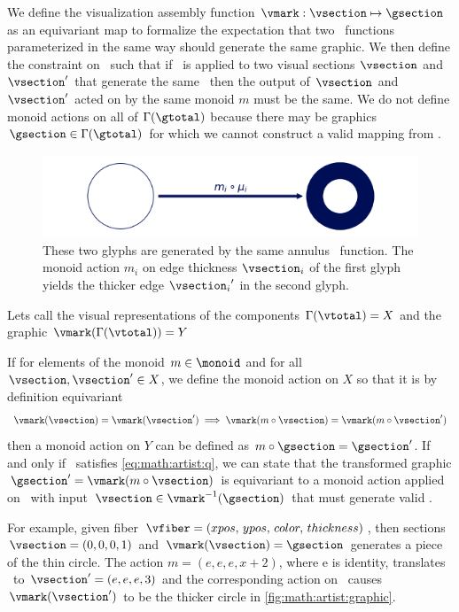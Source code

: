 \documentclass[../main.tex]{subfiles}
\begin{document}
We define the visualization assembly function $\vmark: \vsection \mapsto \gsection$ as an equivariant map to formalize the expectation that two \vmark\ functions parameterized in the same way should generate the same graphic. We then define the constraint on \vmark\ such that if \vmark\ is applied to two visual sections $\vsection$ and $\vsection^{\prime}$ that generate the same \gsection\, then the output of $\vsection$ and $\vsection^{\prime}$ acted on by the same monoid $m$ must be the same.  We do not define monoid actions on all of $\Gamma(\gtotal)$ because there may be graphics $\gsection \in \Gamma(\gtotal)$ for which we cannot construct a valid mapping from \vtotal.
\begin{figure}[htb]
  \centering
  \includegraphics[width=\textwidth]{figures/math/diff_type_q.png}
  \caption{These two glyphs are generated by the same annulus \vmark\ function. The monoid action $m_i$ on edge thickness $\vsection_i$ of the first glyph yields the thicker edge ${\vsection_i}^{\prime}$ in the second glyph.}
  \label{fig:math:artist:graphic}
\end{figure}
Lets call the visual representations of the components $\Gamma(\vtotal)=X$ and the graphic $\vmark(\Gamma(\vtotal))=Y$
\begin{prop}
If for elements of the monoid $m \in \monoid$ and for all $\vsection, \vsection^{\prime} \in X$, we define the monoid action on $X$ so that it is by definition equivariant
\begin{equation}
\vmark(\vsection) = \vmark(\vsection^{\prime})\implies \vmark(m\circ\vsection) = \vmark(m\circ\vsection^{\prime})
\label{eq:math:artist:q}
\end{equation}
then a monoid action on $Y$ can be defined as $m\circ \gsection = \gsection^{\prime}$. If and only if \vmark\ satisfies \autoref{eq:math:artist:q}, we can state that the transformed graphic $\gsection^{\prime}=\vmark(m\circ \vsection)$ is equivariant to a monoid action applied on \vmark\ with input $\vsection \in \vmark^{-1}(\gsection)$ that must generate valid \gsection. 
\end{prop}

For example, given fiber $\vfiber=(xpos,\, ypos,\, color,\, thickness)$, then sections $\vsection=(0,0,0,1)$ and $\vmark(\vsection) = \gsection$ generates a piece of the thin circle. The action $m=(e, e, e, x+2)$, where e is identity, translates \vsection\ to  $\vsection^{\prime}=(e,e,e,3)$ and the corresponding action on \gsection\ causes $\vmark(\vsection^{\prime})$ to be the thicker circle in \autoref{fig:math:artist:graphic}.
\end{document}
